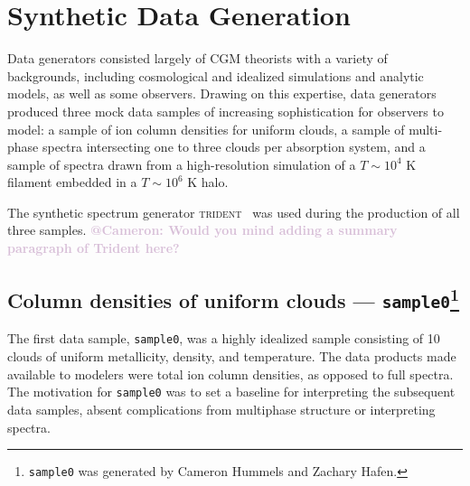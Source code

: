 \documentclass[fleqn,usenatbib]{mnras}
\makeatletter
\newcommand{\atcameron}[1]{\textcolor{Thistle}{\textbf{@Cameron: #1}}}
\makeatother
\begin{document}
\section{Synthetic Data Generation}
\label{s: data generation}

Data generators consisted largely of CGM theorists with a variety of backgrounds, including cosmological and idealized simulations and analytic models, as well as some observers.
Drawing on this expertise, data generators produced three mock data samples of increasing sophistication for observers to model:
a sample of ion column densities for uniform clouds,
a sample of multi-phase spectra intersecting one to three clouds per absorption system,
and a sample of spectra drawn from a high-resolution simulation of a $T \sim 10^4$ K filament embedded in a $T \sim 10^6$ K halo.

The synthetic spectrum generator \textsc{trident}~\citep{Hummels2017} was used during the production of all three samples.
\atcameron{
Would you mind adding a summary paragraph of Trident here?
}

\subsection[Column densities of uniform clouds --- \texttt{sample0}]{Column densities of uniform clouds --- \texttt{sample0}\footnote{
\texttt{sample0} was generated by Cameron Hummels and Zachary Hafen.}}
\label{s: data generation -- sample0}

The first data sample, \texttt{sample0}, was a highly idealized sample consisting of 10 clouds of uniform metallicity, density, and temperature.
The data products made available to modelers were total ion column densities, as opposed to full spectra.
The motivation for \texttt{sample0} was to set a baseline for interpreting the subsequent data samples, absent complications from multiphase structure or interpreting spectra.
\end{document}
